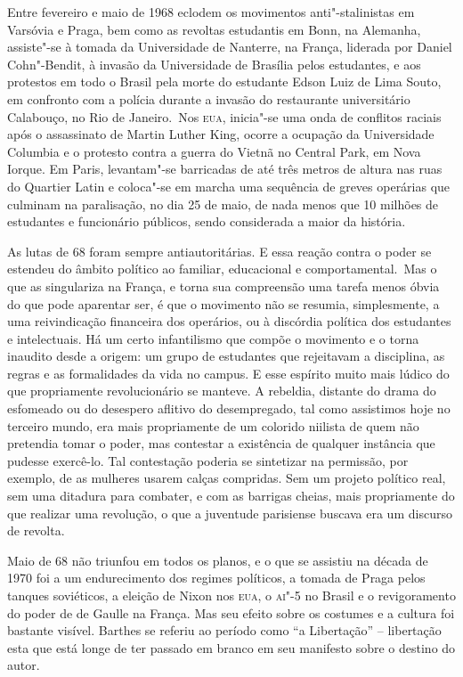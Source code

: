 Entre fevereiro e maio de 1968 eclodem os movimentos anti"-stalinistas em
Varsóvia e Praga, bem como as revoltas estudantis em Bonn, na Alemanha,
assiste"-se à tomada da Universidade de Nanterre, na França, liderada por
Daniel Cohn"-Bendit, à invasão da Universidade de Brasília pelos
estudantes, e aos protestos em todo o Brasil pela morte do estudante
Edson Luiz de Lima Souto, em confronto com a polícia durante a invasão
do restaurante universitário Calabouço, no Rio de Janeiro.~Nos
\textsc{eua}, inicia"-se uma onda de conflitos raciais após o assassinato
de Martin Luther King, ocorre a ocupação da Universidade Columbia e o
protesto contra a guerra do Vietnã no Central Park, em Nova Iorque. Em
Paris, levantam"-se barricadas de até três metros de altura nas ruas do
Quartier Latin e coloca"-se em marcha uma sequência de greves operárias
que culminam na paralisação, no dia 25 de maio, de nada menos que 10
milhões de estudantes e funcionário públicos, sendo considerada a maior
da história.

As lutas de 68 foram sempre antiautoritárias. E essa reação contra o
poder se estendeu do âmbito político ao familiar, educacional e
comportamental.~Mas o que as singulariza na França, e torna sua
compreensão uma tarefa menos óbvia do que pode aparentar ser, é que o
movimento não se resumia, simplesmente, a uma reivindicação financeira
dos operários, ou à discórdia política dos estudantes e intelectuais. Há
um certo infantilismo que compõe o movimento e o torna inaudito desde a
origem: um grupo de estudantes que rejeitavam a disciplina, as regras e
as formalidades da vida no campus. E esse espírito muito mais lúdico do
que propriamente revolucionário se manteve. A rebeldia, distante do
drama do esfomeado ou do desespero aflitivo do desempregado, tal como
assistimos hoje no terceiro mundo, era mais propriamente de um colorido
niilista de quem não pretendia tomar o poder, mas contestar a existência
de qualquer instância que pudesse exercê-lo. Tal contestação poderia se
sintetizar na permissão, por exemplo, de as mulheres usarem calças
compridas. Sem um projeto político real, sem uma ditadura para combater,
e com as barrigas cheias, mais propriamente do que realizar uma
revolução, o que a juventude parisiense buscava era um discurso de
revolta.

Maio de 68 não triunfou em todos os planos, e o que se assistiu na
década de 1970 foi a um endurecimento dos regimes políticos, a tomada de
Praga pelos tanques soviéticos, a eleição de Nixon nos \textsc{eua}, o
\textsc{ai"-5} no Brasil e o revigoramento do poder de de Gaulle na
França. Mas seu efeito sobre os costumes e a cultura foi bastante
visível. Barthes se referiu ao período como ``a Libertação'' --
libertação esta que está longe de ter passado em branco em seu manifesto
sobre o destino do autor.

